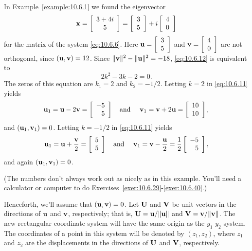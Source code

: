 \begin{example}
  \label{example:10.6.5} \rm In Example~\ref{example:10.6.1} we found the eigenvector
  \[
    {\bf x}=\left[\begin{array}{c}3+4i\\5\end{array}\right]=\left[\begin{array}{l}3\\5\end{array}\right]+i\left[\begin{array}{l}4\\0\end{array}\right]
  \]
  for the matrix of the system \eqref{eq:10.6.6}. Here ${\bf u}=\displaystyle{\left[\begin{array}{l}3\\5\end{array}\right]}$ and
  ${\bf v}=\left[\begin{array}{l}4\\0\end{array}\right]$ are not orthogonal, since $({\bf u},{\bf v})=12$. Since
  $\|{\bf v}\|^{2}-\|{\bf u}\|^{2}=-18$, \eqref{eq:10.6.12} is equivalent to
  \[
    2k^{2}-3k-2=0.
  \]
  The zeros of this equation are $k_{1}=2$ and $k_{2}=-1/2$. Letting $k=2$ in \eqref{eq:10.6.11}
  yields
  \[
    {\bf u}_{1}={\bf u}-2{\bf v}=\left[\begin{array}{l}-5\\\phantom{-}5\end{array}\right]\mbox{\quad and \quad}{\bf v}_{1}={\bf v}+2{\bf u}=\left[\begin{array}{l}10\\10\end{array}\right],
  \]
  and $({\bf u}_{1},{\bf v}_{1})=0$. Letting $k=-1/2$ in \eqref{eq:10.6.11} yields
  \[
    {\bf u}_{1}={\bf u}+\frac{{\bf v}}{2}=\left[\begin{array}{l}5\\5\end{array}\right]\mbox{\quad and \quad}{\bf v}_{1}={\bf v}-\frac{{\bf u}}{2}=\frac{1}{2}\left[\begin{array}{l}-5\\\phantom{-}5\end{array}\right],
  \]
  and again $({\bf u}_{1},{\bf v}_{1})=0$. \bbox
\end{example}

(The numbers don't always work out as nicely as in this example. You'll need a calculator or
computer to do Exercises~\ref{exer:10.6.29}-\ref{exer:10.6.40}.)

Henceforth, we'll assume that $({\bf u},{\bf v})=0$. Let ${\bf U}$ and ${\bf V}$ be unit vectors in
the directions of ${\bf u}$ and ${\bf v}$, respectively; that is, ${\bf U}={\bf u}/\|{\bf u}\|$ and
${\bf V}={\bf v}/\|{\bf v}\|$. The new rectangular coordinate system will have the same origin as
the $y_{1}$-$y_{2}$ system. The coordinates of a point in this system will be denoted by
$(z_{1},z_{2})$, where $z_{1}$ and $z_{2}$ are the displacements in the directions of ${\bf U}$ and
${\bf V}$, respectively.

